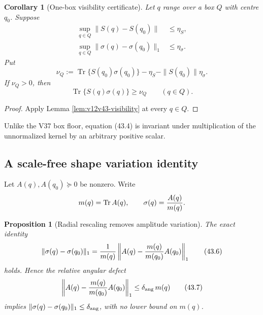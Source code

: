\documentclass[11pt]{article}
\newtheorem{proposition}[theorem]{Proposition}
\newtheorem{corollary}[theorem]{Corollary}
\theoremstyle{remark}
\begin{document}
\begin{corollary}[One-box visibility certificate]
\label{cor:v12v43-box-visibility}
Let \(q\) range over a box \(Q\) with centre \(q_0\).  Suppose
\begin{align}
 \sup_{q\in Q}\|S(q)-S(q_0)\|&\leq\eta_S,         \tag{43.2}\\
 \sup_{q\in Q}\|\sigma(q)-\sigma(q_0)\|_1
 &\leq\eta_\sigma.                               \tag{43.3}
\end{align}
Put
\begin{equation}
 \nu_Q:=
 \operatorname{Tr}\{S(q_0)\sigma(q_0)\}
 -\eta_S-\|S(q_0)\|\eta_\sigma.                  \tag{43.4}
\end{equation}
If \(\nu_Q>0\), then
\begin{equation}
 \operatorname{Tr}\{S(q)\sigma(q)\}\geq\nu_Q
 \qquad(q\in Q).                                 \tag{43.5}
\end{equation}
\end{corollary}

\begin{proof}
Apply Lemma \ref{lem:v12v43-visibility} at every \(q\in Q\).
\end{proof}

Unlike the V37 box floor, equation (43.4) is invariant under
multiplication of the unnormalized kernel by an arbitrary positive
scalar.

\subsection{A scale-free shape variation identity}

Let \(A(q),A(q_0)\succeq0\) be nonzero.  Write
\[
 m(q)=\operatorname{Tr}A(q),\qquad
 \sigma(q)={A(q)\over m(q)}.
\]

\begin{proposition}[Radial rescaling removes amplitude variation]
\label{prop:v12v43-radial}
The exact identity
\begin{equation}
 \|\sigma(q)-\sigma(q_0)\|_1
 =
 {1\over m(q)}
 \left\|
 A(q)-{m(q)\over m(q_0)}A(q_0)
 \right\|_1                                      \tag{43.6}
\end{equation}
holds.  Hence the relative angular defect
\begin{equation}
 \left\|
 A(q)-{m(q)\over m(q_0)}A(q_0)
 \right\|_1
 \leq\delta_{\rm ang}\,m(q)                     \tag{43.7}
\end{equation}
implies
\(\|\sigma(q)-\sigma(q_0)\|_1\leq\delta_{\rm ang}\), with no
lower bound on \(m(q)\).
\end{proposition}
\end{document}
